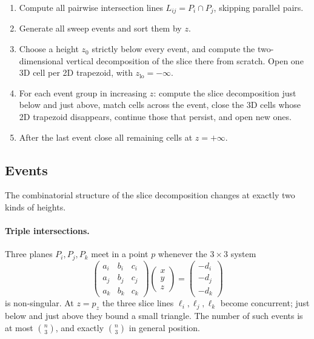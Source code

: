 \documentclass[11pt]{article}
\begin{document}
\begin{enumerate}
\item Compute all pairwise intersection lines $L_{ij} = P_i \cap P_j$, skipping
  parallel pairs.
\item Generate all sweep events and sort them by $z$.
\item Choose a height $z_0$ strictly below every event, and compute the
  two-dimensional vertical decomposition of the slice there from scratch.  Open
  one 3D cell per 2D trapezoid, with $z_{\mathrm{lo}} = -\infty$.
\item For each event group in increasing $z$: compute the slice decomposition
  just below and just above, match cells across the event, close the 3D cells
  whose 2D trapezoid disappears, continue those that persist, and open new ones.
\item After the last event close all remaining cells at $z = +\infty$.
\end{enumerate}

\subsection{Events}

The combinatorial structure of the slice decomposition changes at exactly two
kinds of heights.

\paragraph{Triple intersections.}
Three planes $P_i, P_j, P_k$ meet in a point $p$ whenever the $3 \times 3$
system
\[
  \begin{pmatrix} a_i & b_i & c_i \\ a_j & b_j & c_j \\ a_k & b_k & c_k
  \end{pmatrix}
  \begin{pmatrix} x \\ y \\ z \end{pmatrix}
  = \begin{pmatrix} -d_i \\ -d_j \\ -d_k \end{pmatrix}
\]
is non-singular.  At $z = p_z$ the three slice lines $\ell_i, \ell_j, \ell_k$
become concurrent; just below and just above they bound a small triangle.  The
number of such events is at most $\binom{n}{3}$, and exactly $\binom{n}{3}$ in
general position.
\end{document}
